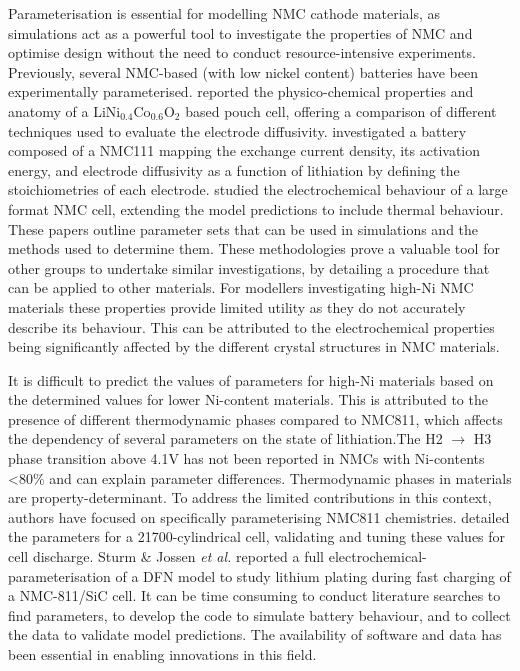 \documentclass[journal=jacsat,manuscript=article]{achemso}
\begin{document}
Parameterisation is essential for modelling NMC cathode materials, as simulations act as a powerful tool to investigate the properties of NMC and optimise design without the need to conduct resource-intensive experiments.\cite{shearing_2020_3D} 
Previously, several NMC-based (with low nickel content) batteries have been experimentally parameterised. \cite{Ecker2015,Schmalstieg_Rahe_Ecker_Sauer_2018,Liebig_2019} \citeauthor{Ecker2015} reported the physico-chemical properties and anatomy of a LiNi$_{0.4}$Co$_{0.6}$O$_2$ based pouch cell, offering a comparison of different techniques used to evaluate the electrode diffusivity. \cite{Ecker2015} \citeauthor{Schmalstieg_Rahe_Ecker_Sauer_2018} investigated a battery composed of a NMC111 mapping the exchange current density, its activation energy, and electrode diffusivity as a function of lithiation by defining the stoichiometries of each electrode. \cite{Schmalstieg_Rahe_Ecker_Sauer_2018} \citeauthor{Liebig_2019} studied the electrochemical behaviour of a large format NMC cell, extending the model predictions to include thermal behaviour. \cite{Liebig_2019}  These papers outline parameter sets that can be used in simulations and the methods used to determine them. These methodologies prove a valuable tool for other groups to undertake similar investigations, by detailing a procedure that can be applied to other materials. For modellers investigating high-Ni NMC materials these properties provide limited utility as they do not accurately describe its behaviour. This can be attributed to the electrochemical properties being significantly affected by the different crystal structures in NMC materials.\cite{noh2013comparison} 

It is difficult to predict the values of parameters for high-Ni materials based on the determined values for lower Ni-content materials.\cite{Amin_Chiang_2016} This is attributed to the presence of different thermodynamic phases compared to NMC811, which affects the dependency of several parameters on the state of lithiation.The H2 $\rightarrow$ H3 phase transition above 4.1V has not been reported in NMCs with Ni-contents \textless80\% and can explain parameter differences.\cite{jung2017oxygen} Thermodynamic phases in materials are  property-determinant. To address the limited contributions in this context, authors have focused on specifically parameterising NMC811 chemistries. \citeauthor{Chen2020} detailed the parameters for a 21700-cylindrical cell, validating and tuning these values for cell discharge.\cite{Chen2020}  Sturm \& Jossen \textit{et al.} reported a full electrochemical-parameterisation of a DFN model to study lithium plating during fast charging of a NMC-811/SiC cell. \cite{Sturm2019b,Sturm2019} It can be time consuming to conduct literature searches to find parameters, to develop the code to simulate battery behaviour, and to collect the data to validate model predictions. The availability of software and data has been essential in enabling innovations in this field.
\end{document}
